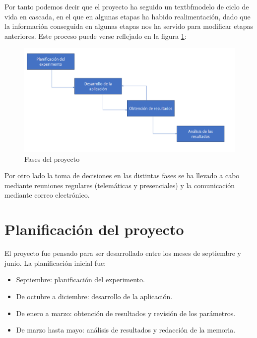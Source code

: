 \documentclass[a4paper,11pt, oneside]{book}
\begin{document}
Por tanto podemos decir que el proyecto ha seguido un textbf{modelo de ciclo de vida en cascada}, en el que en algunas etapas ha habido realimentación, dado que la información conseguida en algunas etapas nos ha servido para modificar etapas anteriores. Este proceso puede verse reflejado en la figura \ref{fig:fases}:

\begin{figure}[H]
	
	\centering
	\includegraphics[width=\linewidth]{diagrama-fases}
	\caption{Fases del proyecto}
	\label{fig:fases}
	
\end{figure}

Por otro lado la toma de decisiones en las distintas fases se ha llevado a cabo mediante reuniones regulares (telemáticas y presenciales) y la comunicación mediante correo electrónico.

\section{Planificación del proyecto}
El proyecto fue pensado para ser desarrollado entre los meses de septiembre y junio. La planificación inicial fue:
\begin{itemize}
	\item Septiembre: planificación del experimento.
	\item De octubre a diciembre: desarrollo de la aplicación.
	\item De enero a marzo: obtención de resultados y revisión de los parámetros.
	\item De marzo hasta mayo: análisis de resultados y redacción de la memoria.
\end{itemize}
\end{document}
